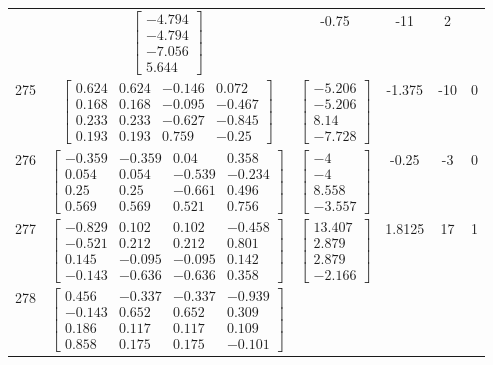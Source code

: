 \documentclass[a4paper,12pt]{article}
\begin{document}
\begin{tabular}{c c c c c c}
&
$\begin{bmatrix} -4.794 \\ -4.794 \\ -7.056 \\ 5.644 \end{bmatrix}$
&
-0.75
&
-11
&
2
\\
275
&
$\begin{bmatrix} 0.624 & 0.624 & -0.146 & 0.072 \\ 0.168 & 0.168 & -0.095 & -0.467 \\ 0.233 & 0.233 & -0.627 & -0.845 \\ 0.193 & 0.193 & 0.759 & -0.25 \end{bmatrix}$
&
$\begin{bmatrix} -5.206 \\ -5.206 \\ 8.14 \\ -7.728 \end{bmatrix}$
&
-1.375
&
-10
&
0
\\
276
&
$\begin{bmatrix} -0.359 & -0.359 & 0.04 & 0.358 \\ 0.054 & 0.054 & -0.539 & -0.234 \\ 0.25 & 0.25 & -0.661 & 0.496 \\ 0.569 & 0.569 & 0.521 & 0.756 \end{bmatrix}$
&
$\begin{bmatrix} -4 \\ -4 \\ 8.558 \\ -3.557 \end{bmatrix}$
&
-0.25
&
-3
&
0
\\
277
&
$\begin{bmatrix} -0.829 & 0.102 & 0.102 & -0.458 \\ -0.521 & 0.212 & 0.212 & 0.801 \\ 0.145 & -0.095 & -0.095 & 0.142 \\ -0.143 & -0.636 & -0.636 & 0.358 \end{bmatrix}$
&
$\begin{bmatrix} 13.407 \\ 2.879 \\ 2.879 \\ -2.166 \end{bmatrix}$
&
1.8125
&
17
&
1
\\
278
&
$\begin{bmatrix} 0.456 & -0.337 & -0.337 & -0.939 \\ -0.143 & 0.652 & 0.652 & 0.309 \\ 0.186 & 0.117 & 0.117 & 0.109 \\ 0.858 & 0.175 & 0.175 & -0.101 \end{bmatrix}$

\end{tabular}
\end{document}
